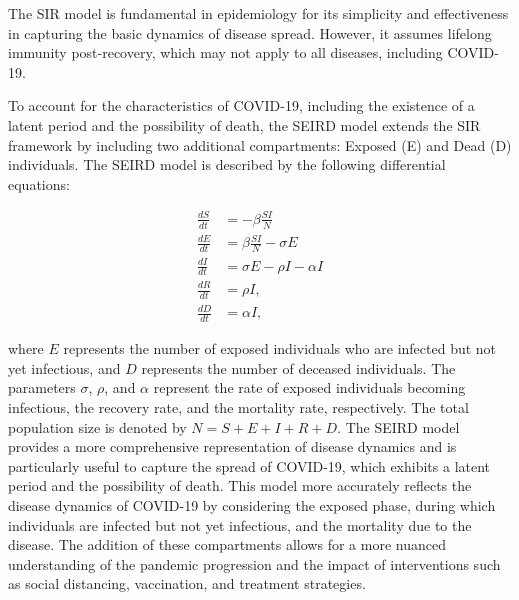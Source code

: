 \documentclass[12pt]{article}
\begin{document}
    
The SIR model is fundamental in epidemiology for its simplicity and effectiveness in capturing the basic dynamics of disease spread. However, it assumes lifelong immunity post-recovery, which may not apply to all diseases, including COVID-19.

To account for the characteristics of COVID-19, including the existence of a latent period and the possibility of death, the SEIRD model extends the SIR framework by including two additional compartments: Exposed (E) and Dead (D) individuals. The SEIRD model is described by the following differential equations:

\begin{equation}
    \begin{align}
        \frac{dS}{dt} &= -\beta \frac{SI}{N} \\
        \frac{dE}{dt} &= \beta \frac{SI}{N} - \sigma E \\
        \frac{dI}{dt} &= \sigma E - \rho I - \alpha I \\
        \frac{dR}{dt} &= \rho I, \\
        \frac{dD}{dt} &= \alpha I,
    \end{align}
\end{equation}

where $E$ represents the number of exposed individuals who are infected but not yet infectious, and $D$ represents the number of deceased individuals. The parameters $\sigma$, $\rho$, and $\alpha$ represent the rate of exposed individuals becoming infectious, the recovery rate, and the mortality rate, respectively. The total population size is denoted by $N = S + E + I + R + D$. The SEIRD model provides a more comprehensive representation of disease dynamics and is particularly useful to capture the spread of COVID-19, which exhibits a latent period and the possibility of death. This model more accurately reflects the disease dynamics of COVID-19 by considering the exposed phase, during which individuals are infected but not yet infectious, and the mortality due to the disease. The addition of these compartments allows for a more nuanced understanding of the pandemic progression and the impact of interventions such as social distancing, vaccination, and treatment strategies.
\end{document}
